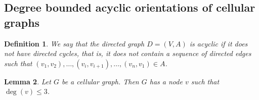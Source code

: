 \documentclass[a4paper, 12pt]{article}
\newtheorem{lem}{Lemma}[section]
\newtheorem{defin}[lem]{Definition}
\begin{document}
\subsection{Degree bounded acyclic orientations of cellular graphs}\label{sec:orientation}

\begin{defin}We say that the directed graph $D=(V,A)$ is acyclic if it does not have directed cycles, that is, it does not contain a sequence of directed edges such that $(v_1,v_2),\ldots,(v_i,v_{i+1}),\ldots,(v_n,v_1) \in A$.
\end{defin}


\begin{lem}\label{lem:degree-constraint}
Let $G$ be a cellular graph. Then $G$ has a node $v$ such that $\deg(v) \leqslant 3$.
\end{lem}
\end{document}
